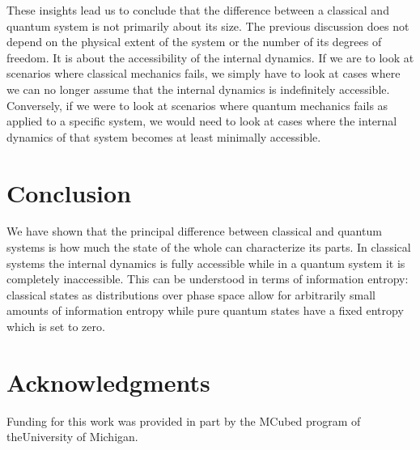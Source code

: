 \documentclass{ws-ijqi}
\begin{document}
These insights lead us to conclude that the difference between a classical and quantum system is not primarily about its size. The previous discussion does not depend on the physical extent of the system or the number of its degrees of freedom. It is about the accessibility of the internal dynamics. If we are to look at scenarios where classical mechanics fails, we simply have to look at cases where we can no longer assume that the internal dynamics is indefinitely accessible. Conversely, if we were to look at scenarios where quantum mechanics fails as applied to a specific system, we would need to look at cases where the internal dynamics of that system becomes at least minimally accessible.

\section{Conclusion}

We have shown that the principal difference between classical and quantum systems is how much the state of the whole can characterize its parts. In classical systems the internal dynamics is fully accessible while in a quantum system it is completely inaccessible. This can be understood in terms of information entropy: classical states as distributions over phase space allow for arbitrarily small amounts of information entropy while pure quantum states have a fixed entropy which is set to zero.

\section*{Acknowledgments}

 Funding for this work was provided in part by the MCubed program of theUniversity of Michigan.


\renewcommand\bibname{References}



\end{document}
